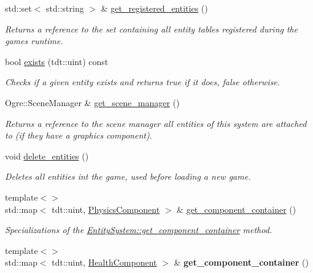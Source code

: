 \begin{DoxyCompactItemize}
std\+::set$<$ std\+::string $>$ \& \hyperlink{class_entity_system_a205a1ec0b7919409c99996d4f38660a6}{get\+\_\+registered\+\_\+entities} ()
\begin{DoxyCompactList}\small\item\em Returns a reference to the set containing all entity tables registered during the game\textquotesingle{}s runtime. \end{DoxyCompactList}\item 
bool \hyperlink{class_entity_system_a55067af795708645b34ca4586208d95c}{exists} (tdt\+::uint) const 
\begin{DoxyCompactList}\small\item\em Checks if a given entity exists and returns true if it does, false otherwise. \end{DoxyCompactList}\item 
Ogre\+::\+Scene\+Manager \& \hyperlink{class_entity_system_ab3fdbf9ba452c2dab05221f007a63602}{get\+\_\+scene\+\_\+manager} ()
\begin{DoxyCompactList}\small\item\em Returns a reference to the scene manager all entities of this system are attached to (if they have a graphics component). \end{DoxyCompactList}\item 
void \hyperlink{class_entity_system_add914f62bb89bd8cbbd53d46dbd26875}{delete\+\_\+entities} ()
\begin{DoxyCompactList}\small\item\em Deletes all entities int the game, used before loading a new game. \end{DoxyCompactList}\item 
{\footnotesize template$<$$>$ }\\std\+::map$<$ tdt\+::uint, \hyperlink{struct_physics_component}{Physics\+Component} $>$ \& \hyperlink{class_entity_system_aff2e00095e3d492861180202c45ee477}{get\+\_\+component\+\_\+container} ()
\begin{DoxyCompactList}\small\item\em Specializations of the \hyperlink{class_entity_system_ab2bacfe1a7fa117764850f60ead892df}{Entity\+System\+::get\+\_\+component\+\_\+container} method. \end{DoxyCompactList}\item 
{\footnotesize template$<$$>$ }\\std\+::map$<$ tdt\+::uint, \hyperlink{struct_health_component}{Health\+Component} $>$ \& {\bfseries get\+\_\+component\+\_\+container} ()\hypertarget{class_entity_system_a508eed877d281573b043faf930d7d342}{}\label{class_entity_system_a508eed877d281573b043faf930d7d342}


\end{DoxyCompactItemize}
